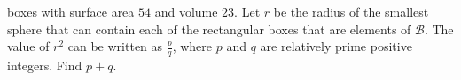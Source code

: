 \documentclass{article}
\begin{document}
\begin{enumerate}[label=\arabic*., itemsep=0.5em]
boxes with surface area $54$ and volume $23$. Let $r$ be the radius of the smallest sphere that can contain each of the rectangular boxes that are elements of $\mathcal{B}$. The value of $r^2$ can be written as $\frac{p}{q}$, where $p$ and $q$ are relatively prime positive integers. Find $p+q$.\par \vspace{0.5em}\end{enumerate}
\end{document}
